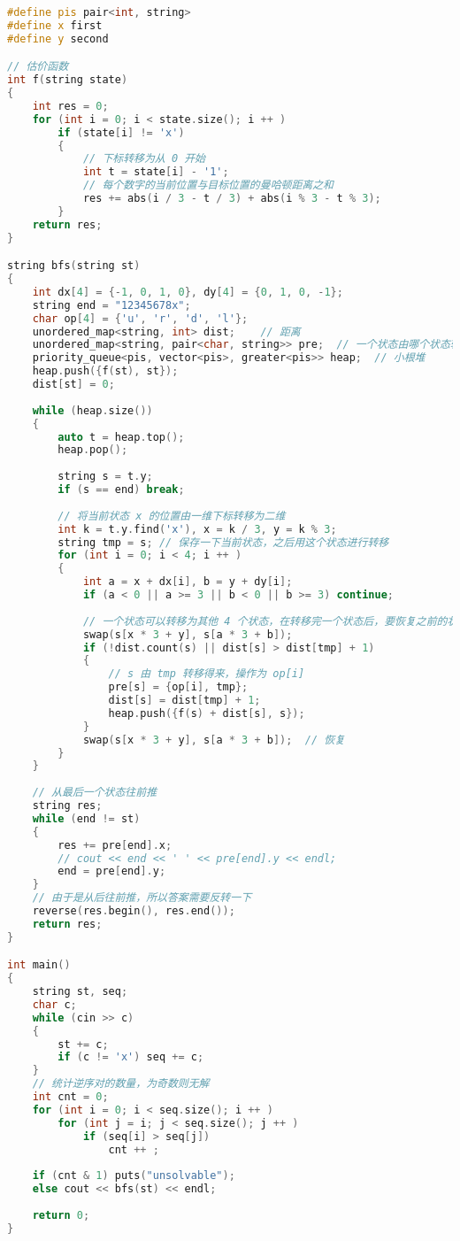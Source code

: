 \begin{lstlisting}[language=cpp]
#define pis pair<int, string>
#define x first
#define y second

// 估价函数
int f(string state)
{
    int res = 0;
    for (int i = 0; i < state.size(); i ++ )
        if (state[i] != 'x')
        {
            // 下标转移为从 0 开始
            int t = state[i] - '1';
            // 每个数字的当前位置与目标位置的曼哈顿距离之和
            res += abs(i / 3 - t / 3) + abs(i % 3 - t % 3);
        }
    return res;
}

string bfs(string st)
{
    int dx[4] = {-1, 0, 1, 0}, dy[4] = {0, 1, 0, -1};
    string end = "12345678x";
    char op[4] = {'u', 'r', 'd', 'l'};
    unordered_map<string, int> dist;    // 距离
    unordered_map<string, pair<char, string>> pre;  // 一个状态由哪个状态转移得来
    priority_queue<pis, vector<pis>, greater<pis>> heap;  // 小根堆
    heap.push({f(st), st});
    dist[st] = 0;
    
    while (heap.size())
    {
        auto t = heap.top();
        heap.pop();
        
        string s = t.y;
        if (s == end) break;
        
        // 将当前状态 x 的位置由一维下标转移为二维
        int k = t.y.find('x'), x = k / 3, y = k % 3;
        string tmp = s; // 保存一下当前状态，之后用这个状态进行转移
        for (int i = 0; i < 4; i ++ )
        {
            int a = x + dx[i], b = y + dy[i];
            if (a < 0 || a >= 3 || b < 0 || b >= 3) continue;
            
            // 一个状态可以转移为其他 4 个状态，在转移完一个状态后，要恢复之前的状态
            swap(s[x * 3 + y], s[a * 3 + b]);
            if (!dist.count(s) || dist[s] > dist[tmp] + 1)
            {
                // s 由 tmp 转移得来，操作为 op[i]
                pre[s] = {op[i], tmp};
                dist[s] = dist[tmp] + 1;
                heap.push({f(s) + dist[s], s});
            }
            swap(s[x * 3 + y], s[a * 3 + b]);  // 恢复
        }
    }
    
    // 从最后一个状态往前推
    string res;
    while (end != st)
    {
        res += pre[end].x;
        // cout << end << ' ' << pre[end].y << endl;
        end = pre[end].y;
    }
    // 由于是从后往前推，所以答案需要反转一下
    reverse(res.begin(), res.end());
    return res;
}

int main()
{
    string st, seq;
    char c;
    while (cin >> c)
    {
        st += c;
        if (c != 'x') seq += c; 
    }
    // 统计逆序对的数量，为奇数则无解
    int cnt = 0;
    for (int i = 0; i < seq.size(); i ++ )
        for (int j = i; j < seq.size(); j ++ )
            if (seq[i] > seq[j])
                cnt ++ ;
    
    if (cnt & 1) puts("unsolvable");
    else cout << bfs(st) << endl;
    
    return 0;
}
\end{lstlisting}

